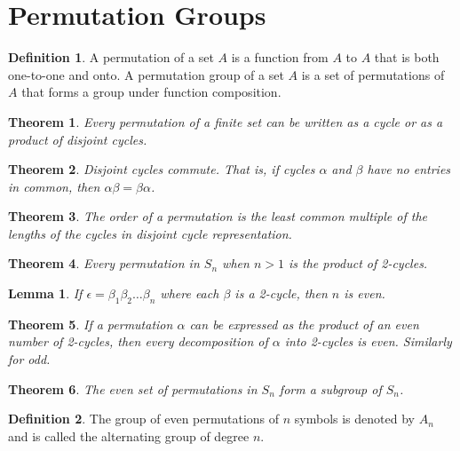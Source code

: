 \documentclass{article}
\newtheorem{theorem}{Theorem}[section]
\newtheorem*{lemma}{Lemma}
\theoremstyle{definition}
\newtheorem*{definition}{Definition}
\begin{document}
\section{Permutation Groups}

\begin{definition}
    A permutation of a set $A$ is a function from $A$ to $A$ that is both one-to-one and onto. A permutation group of a set $A$ is a set of permutations of $A$ that forms a group under function composition.
\end{definition}

\begin{theorem}
    Every permutation of a finite set can be written as a cycle or as a product of disjoint cycles.
\end{theorem}

\begin{theorem}
    Disjoint cycles commute. That is, if cycles $\alpha$ and $\beta$ have no entries in common, then $\alpha\beta = \beta\alpha$.
\end{theorem}

\begin{theorem}
    The order of a permutation is the least common multiple of the lengths of the cycles in disjoint cycle representation.
\end{theorem}

\begin{theorem}
    Every permutation in $S_n$ when $n > 1$ is the product of 2-cycles.
\end{theorem}

\begin{lemma}
    If $\epsilon = \beta_1\beta_2\dots\beta_n$ where each $\beta$ is a 2-cycle, then $n$ is even.
\end{lemma}

\begin{theorem}
    If a permutation $\alpha$ can be expressed as the product of an even number of 2-cycles, then every decomposition of $\alpha$ into 2-cycles is even. Similarly for odd. 
\end{theorem}

\begin{theorem}
    The even set of permutations in $S_n$ form a subgroup of $S_n$.
\end{theorem}

\begin{definition}
    The group of even permutations of $n$ symbols is denoted by $A_n$ and is called the alternating group of degree $n$.
\end{definition}
\end{document}
